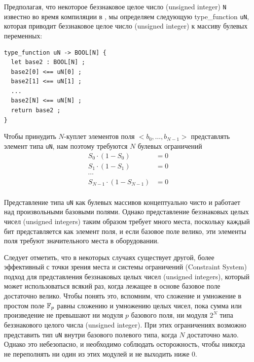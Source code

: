 Предполагая, что некоторое беззнаковое целое число (unsigned integer) \texttt{N} известно во время компиляции в , мы определяем следующую type\_function \texttt{uN}, которая приводит беззнаковое целое число (unsigned integer) к массиву булевых переменных:
\begin{lstlisting}
type_function uN -> BOOL[N] { 
  let base2 : BOOL[N] ;
  base2[0] <== uN[0] ;
  base2[1] <== uN[1] ;
  ...
  base2[N] <== uN[N] ; 
  return base2 ;
}
\end{lstlisting}
Чтобы принудить $N$-куплет элементов поля $<b_0,\ldots,b_{N-1}>$ представлять элемент типа \texttt{uN}, нам поэтому требуются $N$ булевых ограничений
\begin{align*}
S_0 \cdot (1-S_0) & = 0\\
S_1 \cdot (1-S_1) & = 0\\
\cdots &\\
S_{N-1} \cdot (1-S_{N-1}) & = 0\\
\end{align*}
\begin{remark} Представление типа \texttt{uN} как булевых массивов концептуально чисто и работает над произвольными базовыми полями. Однако представление беззнаковых целых чисел (unsigned integers) таким образом требует много места, поскольку каждый бит представляется как элемент поля, и если базовое поле велико, эти элементы поля требуют значительного места в оборудовании.

Следует отметить, что в некоторых случаях существует другой, более эффективный с точки зрения места и системы ограничений (Constraint System) подход для представления беззнаковых целых чисел (unsigned integers), который может использоваться всякий раз, когда лежащее в основе базовое поле достаточно велико. Чтобы понять это, вспомним, что сложение и умножение в простом поле $\mathbb{F}_p$ равны сложению и умножению целых чисел, пока сумма или произведение не превышают ни модуля $p$ базового поля, ни модуля $2^N$ типа беззнакового целого числа (unsigned integer). При этих ограничениях возможно представить тип \texttt{uN} внутри базового полевого типа, когда $N$ достаточно мало. Однако это небезопасно, и необходимо соблюдать осторожность, чтобы никогда не переполнять ни один из этих модулей и не выходить ниже $0$.
\end{remark}
